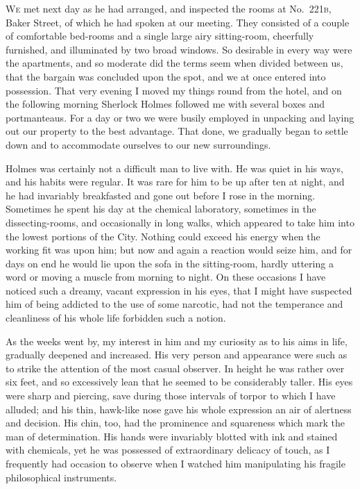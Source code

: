 \documentclass[12pt,english,oneside]{book}
\newcommand{\noun}[1]{\textsc{#1}}
\begin{document}

\lettrine[lines=2]{W}{e} met next day as he had arranged, and inspected the rooms at No.\ \noun{221b},
Baker Street, of which he had spoken at our meeting. They consisted
of a couple of comfortable bed-rooms and a single large airy sitting-room,
cheerfully furnished, and illuminated by two broad windows. So desirable
in every way were the apartments, and so moderate did the terms seem
when divided between us, that the bargain was concluded upon the spot,
and we at once entered into possession. That very evening I moved
my things round from the hotel, and on the following morning Sherlock
Holmes followed me with several boxes and portmanteaus. For a day
or two we were busily employed in unpacking and laying out our property
to the best advantage. That done, we gradually began to settle down
and to accommodate ourselves to our new surroundings.

Holmes was certainly not a difficult man to live with. He was quiet
in his ways, and his habits were regular. It was rare for him to be
up after ten at night, and he had invariably breakfasted and gone
out before I rose in the morning. Sometimes he spent his day at the
chemical laboratory, sometimes in the dissecting-rooms, and occasionally
in long walks, which appeared to take him into the lowest portions
of the City. Nothing could exceed his energy when the working fit
was upon him; but now and again a reaction would seize him, and for
days on end he would lie upon the sofa in the sitting-room, hardly
uttering a word or moving a muscle from morning to night. On these
occasions I have noticed such a dreamy, vacant expression in his eyes,
that I might have suspected him of being addicted to the use of some
narcotic, had not the temperance and cleanliness of his whole life
forbidden such a notion.

As the weeks went by, my interest in him and my curiosity as to his
aims in life, gradually deepened and increased. His very person and
appearance were such as to strike the attention of the most casual
observer. In height he was rather over six feet, and so excessively
lean that he seemed to be considerably taller. His eyes were sharp
and piercing, save during those intervals of torpor to which I have
alluded; and his thin, hawk-like nose gave his whole expression an
air of alertness and decision. His chin, too, had the prominence and
squareness which mark the man of determination. His hands were invariably
blotted with ink and stained with chemicals, yet he was possessed
of extraordinary delicacy of touch, as I frequently had occasion to
observe when I watched him manipulating his fragile philosophical
instruments.
\end{document}
